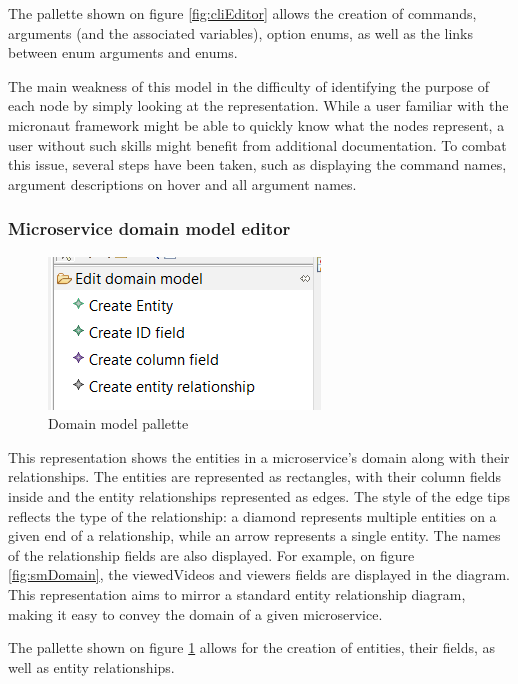 \documentclass[parskip=full]{article}
\begin{document}
    The pallette shown on figure \ref{fig:cliEditor} allows the creation of commands, arguments (and the associated variables), option enums, as well as the links between enum arguments and enums.

    The main weakness of this model in the difficulty of identifying the purpose of each node by simply looking at the representation.
    While a user familiar with the micronaut framework might be able to quickly know what the nodes represent, a user without such skills might benefit from additional documentation.
    To combat this issue, several steps have been taken, such as displaying the command names, argument descriptions on hover and all argument names.
    \subsubsection{Microservice domain model editor}
    \begin{figure}
        \includegraphics[width=0.2\paperwidth]{domain-model-editor-pallette}
        \caption{Domain model pallette}
        \label{fig:domainEditor}
    \end{figure}
    This representation shows the entities in a microservice's domain along with their relationships.
    The entities are represented as rectangles, with their column fields inside and the entity relationships represented as edges.
    The style of the edge tips reflects the type of the relationship: a diamond represents multiple entities on a given end of a relationship, while an arrow represents a single entity.
    The names of the relationship fields are also displayed.
    For example, on figure \ref{fig:smDomain}, the viewedVideos and viewers fields are displayed in the diagram.
    This representation aims to mirror a standard entity relationship diagram, making it easy to convey the domain of a given microservice.

    The pallette shown on figure \ref{fig:domainEditor} allows for the creation of entities, their fields, as well as entity relationships.
\end{document}
